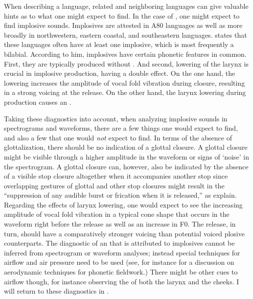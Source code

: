 \documentclass[output=paper]{LSP/langsci}
\begin{document}
When describing a language, related and neighboring languages can give valuable hints as to what one might expect to find. In the case of , one might expect to find implosive sounds.
Implosives are attested in  A80 languages as well as more broadly in northwestern, eastern coastal, and southeastern  languages. \citet[28]{Maddieson2003} states that these languages often have at least one implosive, which is most frequently a bilabial. According to him,  implosives have certain phonetic features in common.  First, they are typically produced without . And second, lowering of the larynx is crucial in  implosive production, having a double effect. On the one hand, the lowering increases the amplitude of vocal fold vibration during closure, resulting in a strong voicing at the release. On the other hand, the larynx lowering during production causes an .

Taking these diagnostics into account, when analyzing implosive sounds in spectrograms and waveforms, there are a few things one would expect to find, and also a few that one would {\it not} expect to find. In terms of the absence of glottalization, there should be no indication of a glottal closure. A glottal closure might be visible through a higher amplitude in the waveform  or signs of `noise' in the spectrogram. A glottal closure can, however, also be indicated by the absence of a visible stop closure  altogether when it accompanies another stop since overlapping gestures of glottal and other stop closures might result in the ``suppression of  any audible burst or frication when it is released,'' as \citet[73]{Ladefoged1996} explain. 
Regarding the effects of larynx lowering, one would expect to see the increasing amplitude of vocal fold vibration in a typical cone shape that occurs in the waveform right before the release as well as an increase in F0. The release, in turn, should have a comparatively stronger voicing than potential voiced plosive counterparts.
The diagnostic of an  that is attributed to  implosives cannot be inferred from spectrogram or waveform analyses; instead special techniques for airflow and air pressure need to be used (see, for instance \citealt{Demolin2011} for a discussion on aerodynamic techniques for phonetic fieldwork.) There might be other cues to airflow though, for instance observing the  of both the larynx and the cheeks. I will return to these diagnostics in .
\end{document}
